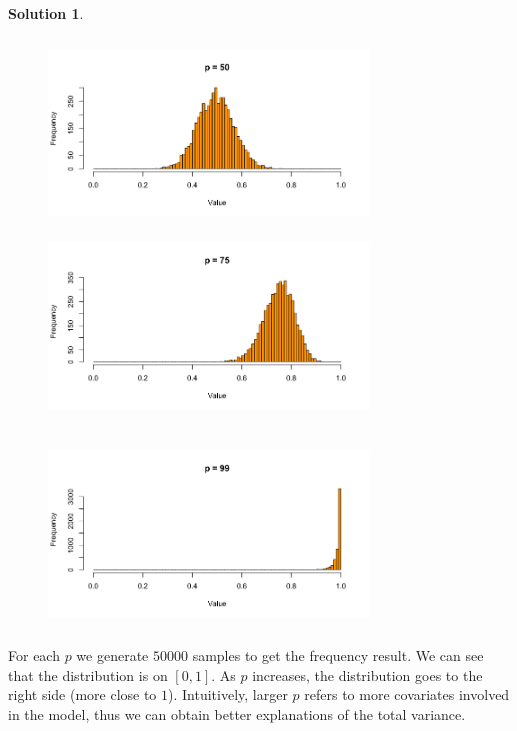 \documentclass[11pt,letterpaper,english,oneside]{article} %
\theoremstyle{definition} %
\newtheorem{solution}{Solution}
\newenvironment{sol}{\begin{solution}\hspace{0pt}}{\end{solution}}
\begin{document}
\begin{sol}
\begin{itemize}
\begin{figure}
\begin{minipage}[ht]{0.5\linewidth}
\centering
    \includegraphics[height = 5cm, width =8.5cm]{figures-and-tables/2-2-3.png}
    \end{minipage}
\begin{minipage}[ht]{0.5\linewidth}
   \centering
    \includegraphics[height = 5cm, width =8.5cm]{figures-and-tables/2-2-4.png}
    \end{minipage}
\end{figure}


\begin{figure}
\begin{minipage}[ht]{0.5\linewidth}
\centering
    \includegraphics[height = 5cm, width =8.5cm]{figures-and-tables/2-2-5.png}
    \end{minipage}
\end{figure}

For each $p$ we generate $50000$ samples to get the frequency result.
We can see that the distribution is on $[0,1]$. As $p$ increases, the distribution goes  to the right side (more close to $1$). Intuitively, larger $p$ refers to more covariates involved in the model, thus we can obtain better explanations of the total variance.


\end{itemize}
\end{sol}
\end{document}
